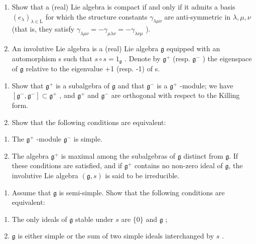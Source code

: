 \begin{enumerate}
\def\labelenumi{\arabic{enumi})}
\setcounter{enumi}{5}
\item
  Show that a (real) Lie algebra is compact if and only if it admits a basis \((e_{\lambda})_{\lambda\in\mathrm{L}}\) for which the structure constants \(\gamma_{\lambda\mu\nu}\) are anti-symmetric in \(\lambda,\mu,\nu\) (that is, they satisfy \(\gamma_{\lambda\mu\nu}=-\gamma_{\mu\lambda\nu}=-\gamma_{\lambda\nu\mu}\) ).
\item
  An involutive Lie algebra is a (real) Lie algebra \(\mathfrak{g}\) equipped with an automorphism s such that \(s \circ s = 1_{\mathfrak{g}}\) . Denote by \(\mathfrak{g}^{+}\) (resp. \(\mathfrak{g}^{-}\) ) the eigenspace of \(\mathfrak{g}\) relative to the eigenvalue +1 (resp. -1) of s.
\end{enumerate}

\begin{enumerate}
\def\labelenumi{\alph{enumi})}
\item
  Show that \(\mathfrak{g}^{+}\) is a subalgebra of \(\mathfrak{g}\) and that \(\mathfrak{g}^{-}\) is a \(\mathfrak{g}^{+}\) -module; we have \([\mathfrak{g}^{-},\mathfrak{g}^{-}] \subset \mathfrak{g}^{+}\) , and \(\mathfrak{g}^{+}\) and \(\mathfrak{g}^{-}\) are orthogonal with respect to the Killing form.
\item
  Show that the following conditions are equivalent:
\end{enumerate}

\begin{enumerate}
\def\labelenumi{(\roman{enumi})}
\item
  The \(\mathfrak{g}^{+}\) -module \(\mathfrak{g}^{-}\) is simple.
\item
  The algebra \(\mathfrak{g}^{+}\) is maximal among the subalgebras of \(\mathfrak{g}\) distinct from \(\mathfrak{g}\). If these conditions are satisfied, and if \(\mathfrak{g}^{+}\) contains no non-zero ideal of \(\mathfrak{g}\), the involutive Lie algebra \((\mathfrak{g}, s)\) is said to be irreducible.
\end{enumerate}

\begin{enumerate}
\def\labelenumi{\alph{enumi})}
\setcounter{enumi}{2}
\tightlist
\item
  Assume that \(\mathfrak{g}\) is semi-simple. Show that the following conditions are equivalent:
\end{enumerate}

\begin{enumerate}
\def\labelenumi{(\roman{enumi})}
\item
  The only ideals of \(\mathfrak{g}\) stable under \(s\) are \(\{0\}\) and \(\mathfrak{g}\) ;
\item
  \(\mathfrak{g}\) is either simple or the sum of two simple ideals interchanged by \(s\) .
\end{enumerate}

